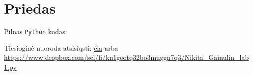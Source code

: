 \documentclass{article}
\begin{document}
\section{Priedas}
Pilnas \lstinline|Python| kodas:


Tiesioginė nuoroda atsisiųsti: \href{https://www.dropbox.com/scl/fi/kn1geotq32bo3muggn7q3/Nikita_Gainulin_lab1.py}{čia} arba \url{https://www.dropbox.com/scl/fi/kn1geotq32bo3muggn7q3/Nikita_Gainulin_lab1.py}
\end{document}
